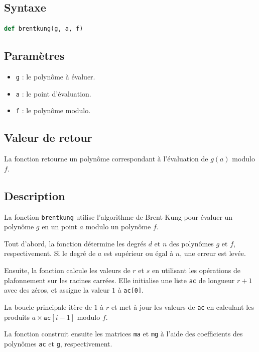 \documentclass[a4paper]{article}
\begin{document}
\subsection*{Syntaxe}

\begin{lstlisting}[language=Python]
def brentkung(g, a, f)
\end{lstlisting}

\subsection*{Paramètres}

\begin{itemize}
  \item \texttt{g} : le polynôme à évaluer.
  \item \texttt{a} : le point d'évaluation.
  \item \texttt{f} : le polynôme modulo.
\end{itemize}

\subsection*{Valeur de retour}

La fonction retourne un polynôme correspondant à l'évaluation de $g(a)$ modulo $f$.

\subsection*{Description}

La fonction \texttt{brentkung} utilise l'algorithme de Brent-Kung pour évaluer un polynôme $g$ en un point $a$ modulo un polynôme $f$.

Tout d'abord, la fonction détermine les degrés $d$ et $n$ des polynômes $g$ et $f$, respectivement. Si le degré de $a$ est supérieur ou égal à $n$, une erreur est levée.

Ensuite, la fonction calcule les valeurs de $r$ et $s$ en utilisant les opérations de plafonnement sur les racines carrées. Elle initialise une liste \texttt{ac} de longueur $r+1$ avec des zéros, et assigne la valeur $1$ à \texttt{ac[0]}.

La boucle principale itère de $1$ à $r$ et met à jour les valeurs de \texttt{ac} en calculant les produits $a \times \texttt{ac}[i-1]$ modulo $f$.

La fonction construit ensuite les matrices \texttt{ma} et \texttt{mg} à l'aide des coefficients des polynômes \texttt{ac} et \texttt{g}, respectivement.
\end{document}
